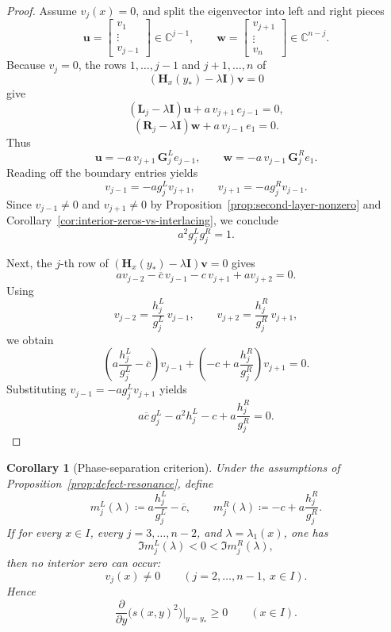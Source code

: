 \documentclass[11pt]{article}
\newtheorem{corollary}[theorem]{Corollary}
\begin{document}
\begin{proof}
Assume \(v_j(x)=0\), and split the eigenvector into left and right pieces
\[
\mathbf u=
\begin{bmatrix}
v_1\\ \vdots\\ v_{j-1}
\end{bmatrix}\in\mathbb C^{j-1},
\qquad
\mathbf w=
\begin{bmatrix}
v_{j+1}\\ \vdots\\ v_n
\end{bmatrix}\in\mathbb C^{n-j}.
\]
Because \(v_j=0\), the rows \(1,\dots,j-1\) and \(j+1,\dots,n\) of
\[
(\mathbf H_x(y_*)-\lambda \mathbf I)\mathbf v=0
\]
give
\[
(\mathbf L_j-\lambda \mathbf I)\mathbf u + a\,v_{j+1}\,e_{j-1}=0,
\]
\[
(\mathbf R_j-\lambda \mathbf I)\mathbf w + a\,v_{j-1}\,e_{1}=0.
\]
Thus
\[
\mathbf u=-a\,v_{j+1}\,\mathbf G_j^{L}e_{j-1},
\qquad
\mathbf w=-a\,v_{j-1}\,\mathbf G_j^{R}e_{1}.
\]
Reading off the boundary entries yields
\[
v_{j-1}=-a g_j^{L}v_{j+1},
\qquad
v_{j+1}=-a g_j^{R}v_{j-1}.
\]
Since \(v_{j-1}\neq 0\) and \(v_{j+1}\neq 0\) by Proposition~\ref{prop:second-layer-nonzero} and Corollary~\ref{cor:interior-zeros-vs-interlacing}, we conclude
\[
a^2 g_j^{L}g_j^{R}=1.
\]

Next, the \(j\)-th row of \((\mathbf H_x(y_*)-\lambda \mathbf I)\mathbf v=0\) gives
\[
a v_{j-2}-\overline c\,v_{j-1}-c\,v_{j+1}+a v_{j+2}=0.
\]
Using
\[
v_{j-2}=\frac{h_j^{L}}{g_j^{L}}\,v_{j-1},
\qquad
v_{j+2}=\frac{h_j^{R}}{g_j^{R}}\,v_{j+1},
\]
we obtain
\[
\left(a\frac{h_j^{L}}{g_j^{L}}-\overline c\right)v_{j-1}
+
\left(-c+a\frac{h_j^{R}}{g_j^{R}}\right)v_{j+1}
=0.
\]
Substituting \(v_{j-1}=-a g_j^{L}v_{j+1}\) yields
\[
a\overline c\,g_j^{L}-a^2 h_j^{L}-c+a\frac{h_j^{R}}{g_j^{R}}=0.
\]
\end{proof}

\begin{corollary}[Phase-separation criterion]\label{cor:phase-separation}
Under the assumptions of Proposition~\ref{prop:defect-resonance}, define
\[
m_j^{L}(\lambda)\coloneqq a\frac{h_j^{L}}{g_j^{L}}-\overline c,
\qquad
m_j^{R}(\lambda)\coloneqq -c+a\frac{h_j^{R}}{g_j^{R}}.
\]
If for every \(x\in I\), every \(j=3,\dots,n-2\), and \(\lambda=\lambda_1(x)\), one has
\[
\Im m_j^{L}(\lambda)<0<\Im m_j^{R}(\lambda),
\]
then no interior zero can occur:
\[
v_j(x)\neq 0
\qquad
(j=2,\dots,n-1,\ x\in I).
\]
Hence
\[
\frac{\partial}{\partial y}\bigl(s(x,y)^2\bigr)\Big|_{y=y_*}\ge 0
\qquad (x\in I).
\]
\end{corollary}
\end{document}
